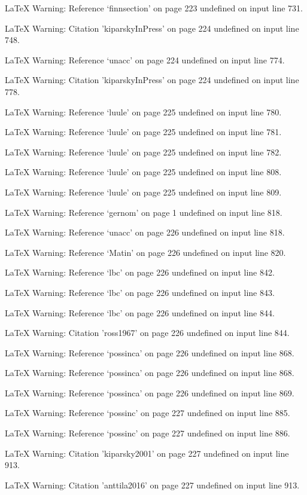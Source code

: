 LaTeX Warning: Reference `finnsection' on page 223 undefined on input line 731.


LaTeX Warning: Citation 'kiparskyInPress' on page 224 undefined on input line 748.


LaTeX Warning: Reference `unacc' on page 224 undefined on input line 774.


LaTeX Warning: Citation 'kiparskyInPress' on page 224 undefined on input line 778.


LaTeX Warning: Reference `luule' on page 225 undefined on input line 780.


LaTeX Warning: Reference `luule' on page 225 undefined on input line 781.


LaTeX Warning: Reference `luule' on page 225 undefined on input line 782.


LaTeX Warning: Reference `luule' on page 225 undefined on input line 808.


LaTeX Warning: Reference `luule' on page 225 undefined on input line 809.


LaTeX Warning: Reference `gernom' on page 1 undefined on input line 818.


LaTeX Warning: Reference `unacc' on page 226 undefined on input line 818.


LaTeX Warning: Reference `Matin' on page 226 undefined on input line 820.


LaTeX Warning: Reference `lbc' on page 226 undefined on input line 842.


LaTeX Warning: Reference `lbc' on page 226 undefined on input line 843.


LaTeX Warning: Reference `lbc' on page 226 undefined on input line 844.


LaTeX Warning: Citation 'ross1967' on page 226 undefined on input line 844.


LaTeX Warning: Reference `possinca' on page 226 undefined on input line 868.


LaTeX Warning: Reference `possinca' on page 226 undefined on input line 868.


LaTeX Warning: Reference `possinca' on page 226 undefined on input line 869.


LaTeX Warning: Reference `possinc' on page 227 undefined on input line 885.


LaTeX Warning: Reference `possinc' on page 227 undefined on input line 886.


LaTeX Warning: Citation 'kiparsky2001' on page 227 undefined on input line 913.


LaTeX Warning: Citation 'anttila2016' on page 227 undefined on input line 913.


